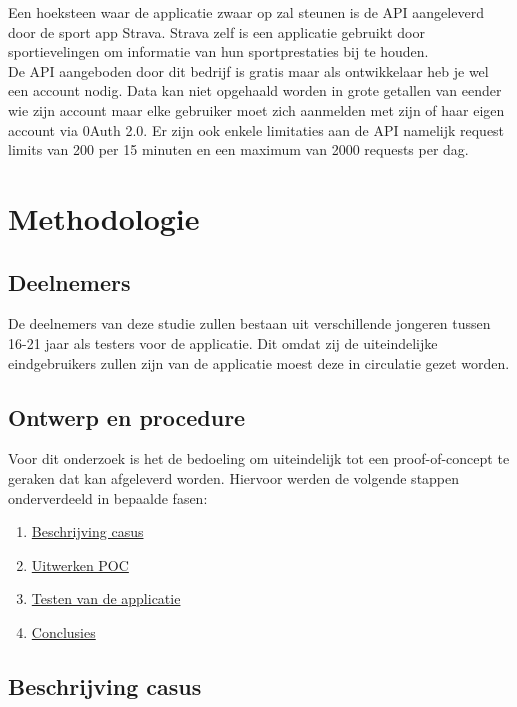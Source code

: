 Een hoeksteen waar de applicatie zwaar op zal steunen is de API aangeleverd door de sport app Strava. Strava zelf is een applicatie gebruikt door sportievelingen om informatie van hun sportprestaties bij te houden. \\

De API aangeboden door dit bedrijf is gratis maar als ontwikkelaar heb je wel een account nodig. Data kan niet opgehaald worden in grote getallen van eender wie zijn account maar elke gebruiker moet zich aanmelden met zijn of haar eigen account via 0Auth 2.0. Er zijn ook enkele limitaties aan de API namelijk request limits van 200 per 15 minuten en een maximum van 2000 requests per dag. \autocite{Strava2023}

\section{Methodologie}%
\label{sec:methodologie}

\subsection{Deelnemers}

De deelnemers van deze studie zullen bestaan uit verschillende jongeren tussen 16-21 jaar als testers voor de applicatie. Dit omdat zij de uiteindelijke eindgebruikers zullen zijn van de applicatie moest deze in circulatie gezet worden.

\subsection{Ontwerp en procedure}

Voor dit onderzoek is het de bedoeling om uiteindelijk tot een proof-of-concept te geraken dat kan afgeleverd worden. Hiervoor werden de volgende stappen onderverdeeld in bepaalde fasen:

\begin{enumerate}
    \item \hyperref[subsub:beschrijving]{Beschrijving casus}
    \item \hyperref[subsub:uitwerking]{Uitwerken POC}
    \item \hyperref[subsub:testfase]{Testen van de applicatie}
    \item \hyperref[subsub:conclusies]{Conclusies}
\end{enumerate}

\subsection{Beschrijving casus}
\label{subsub:beschrijving}

